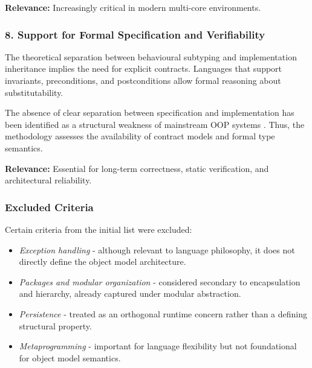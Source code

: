 \textbf{Relevance:} Increasingly critical in modern multi-core environments.

\subsubsection{8. Support for Formal Specification and Verifiability}

The theoretical separation between behavioural subtyping and implementation inheritance \cite{cook1989inheritance} implies the need for explicit contracts. Languages that support invariants, preconditions, and postconditions allow formal reasoning about substitutability.

The absence of clear separation between specification and implementation has been identified as a structural weakness of mainstream OOP systems \cite{mikhajlov1998study}. Thus, the methodology assesses the availability of contract models and formal type semantics.

\textbf{Relevance:} Essential for long-term correctness, static verification, and architectural reliability.

\subsubsection{Excluded Criteria}

Certain criteria from the initial list were excluded:

\begin{itemize}
    \item \textit{Exception handling} - although relevant to language philosophy, it does not directly define the object model architecture.
    \item \textit{Packages and modular organization} - considered secondary to encapsulation and hierarchy, already captured under modular abstraction.
    \item \textit{Persistence} - treated as an orthogonal runtime concern rather than a defining structural property.
    \item \textit{Metaprogramming} - important for language flexibility but not foundational for object model semantics.
\end{itemize}
